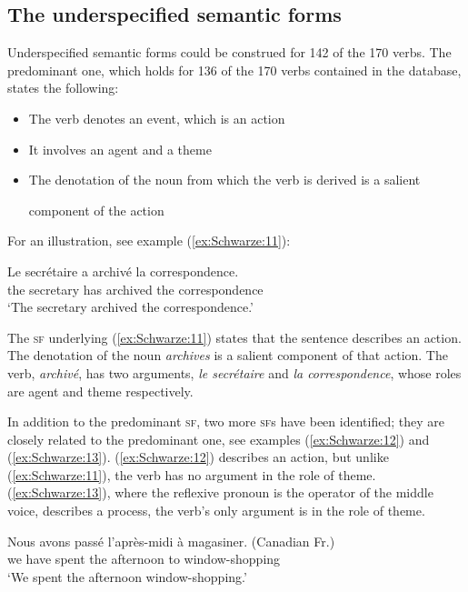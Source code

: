 \documentclass[output=paper]{langsci/langscibook}
\begin{document}
\subsection{The underspecified semantic forms}\label{the-underspecified-semantic-forms}
Underspecified semantic forms could be construed for 142 of the 170
verbs. The predominant one, which holds for 136 of the 170 verbs contained in the database, states the following:

\begin{itemize}
\item The verb denotes an event, which is an action

\item It involves an agent and a theme

\item The denotation of the noun from which the verb is derived is a salient

 component of the action
\end{itemize}

For an illustration, see example (\ref{ex:Schwarze:11}):

\ea\label{ex:Schwarze:11} \gll Le secrétaire a archivé la correspondence.\\
the secretary has archived the correspondence\\
\glt `The secretary archived the correspondence.'
\z

The \textsc{sf} underlying (\ref{ex:Schwarze:11}) states that the sentence describes an action. The denotation of the noun \emph{archives} is a salient component of that action. The verb, \emph{archivé}, has two arguments, \emph{le secrétaire} and \emph{la correspondence}, whose roles are agent and theme respectively.

In addition to the predominant \textsc{sf}, two more \textsc{sf}s have been identified;
they are closely related to the predominant one, see examples (\ref{ex:Schwarze:12}) and
(\ref{ex:Schwarze:13}). (\ref{ex:Schwarze:12}) describes an action, but unlike (\ref{ex:Schwarze:11}), the verb has no argument in the role of theme. (\ref{ex:Schwarze:13}), where the reflexive pronoun is the operator of the middle voice, describes a process, the verb's only argument is in the role of theme.

\ea\label{ex:Schwarze:12} \gll Nous avons passé l'après-midi à magasiner. {(Canadian Fr.)}\\
we have spent {the afternoon} to window-shopping {}\\
\glt `We spent the afternoon window-shopping.'\\
\end{document}
